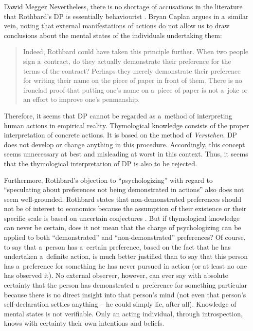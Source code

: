 \begin{artengenv}{Dawid Megger}
Nevertheless, there is no shortage of accusations in the literature that Rothbard's DP is essentially behaviourist 
\parencite[e.g.,][p.574]{prychitko_formalism_1993}. %
 Bryan Caplan argues in a~similar vein, noting that external manifestations of actions do not allow us to draw conclusions about the mental states of the individuals undertaking them:
\begin{quote}
Indeed, Rothbard could have taken this principle further. When two people sign a~contract, do they actually demonstrate their preference for the terms of the contract? Perhaps they merely demonstrate their preference for writing their name on the piece of paper in front of them. There is no ironclad proof that putting one's name on a~piece of paper is not a~joke or an effort to improve one's penmanship. 
\parencite[][p.833]{caplan_austrian_1999}%
\end{quote}
Therefore, it seems that DP cannot be regarded as a~method of interpreting human actions in empirical reality. Thymological knowledge consists of the proper interpretation of concrete actions. It is based on the method of \textit{Verstehen}. DP does not develop or change anything in this procedure. Accordingly, this concept seems unnecessary at best and misleading at worst in this context. Thus, it seems that the thymological interpretation of DP is also to be rejected.



Furthermore, Rothbard's objection to ``psychologizing'' with regard to ``speculating about preferences not being demonstrated in actions'' also does not seem well-grounded. Rothbard states that non-demonstrated preferences should not be of interest to economics because the assumption of their existence or their specific scale is based on uncertain conjectures 
\parencite[][pp.296–298]{rothbard_present_2011}. %
 But if thymological knowledge can never be certain, does it not mean that the charge of psychologizing can be applied to both ``demonstrated'' and ``non-demonstrated'' preferences? Of course, to say that a~person has a~certain preference, based on the fact that he has undertaken a~definite action, is much better justified than to say that this person has a~preference for something he has never pursued in action (or at least no one has observed it). No external observer, however, can ever say with absolute certainty that the person has demonstrated a~preference for something particular because there is no direct insight into that person's mind (not even that person's self-declaration settles anything -- he could simply lie, after all). Knowledge of mental states is not verifiable. Only an acting individual, through introspection, knows with certainty their own intentions and beliefs.




\end{artengenv}
